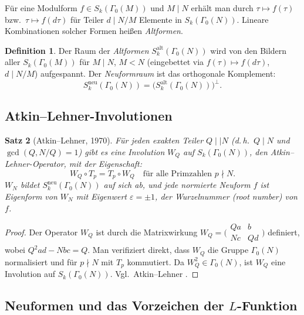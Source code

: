 \documentclass[12pt,a4paper]{amsart}
\newtheorem{theorem}{Satz}[section]
\theoremstyle{definition}
\newtheorem{definition}[theorem]{Definition}
\begin{document}
F\"ur eine Modulform $f \in S_k(\Gamma_0(M))$ und $M \mid N$ erh\"alt man
durch $\tau \mapsto f(\tau)$ bzw.\ $\tau \mapsto f(d\tau)$ f\"ur Teiler
$d \mid N/M$ Elemente in $S_k(\Gamma_0(N))$. Lineare Kombinationen solcher
Formen hei{\ss}en \emph{Altformen}.

\begin{definition}
  Der Raum der \emph{Altformen} $S_k^{\mathrm{alt}}(\Gamma_0(N))$ wird von
  den Bildern aller $S_k(\Gamma_0(M))$ f\"ur $M \mid N$, $M < N$ (eingebettet
  via $f(\tau) \mapsto f(d\tau)$, $d \mid N/M$) aufgespannt. Der
  \emph{Neuformraum} ist das orthogonale Komplement:
  \[
    S_k^{\mathrm{neu}}(\Gamma_0(N)) = \bigl(S_k^{\mathrm{alt}}(\Gamma_0(N))\bigr)^{\perp}.
  \]
\end{definition}

\subsection{Atkin--Lehner-Involutionen}

\begin{theorem}[Atkin--Lehner, 1970]
  F\"ur jeden exakten Teiler $Q \mid\mid N$ (d.\,h.\ $Q \mid N$ und
  $\gcd(Q, N/Q)=1$) gibt es eine Involution $W_Q$ auf $S_k(\Gamma_0(N))$,
  den \emph{Atkin--Lehner-Operator}, mit der Eigenschaft:
  \[
    W_Q \circ T_p = T_p \circ W_Q \quad \text{f\"ur alle Primzahlen } p \nmid N.
  \]
  $W_N$ bildet $S_k^{\mathrm{neu}}(\Gamma_0(N))$ auf sich ab, und jede
  normierte Neuform $f$ ist Eigenform von $W_N$ mit Eigenwert $\varepsilon = \pm 1$,
  der \emph{Wurzelnummer} (\emph{root number}) von $f$.
\end{theorem}

\begin{proof}
  Der Operator $W_Q$ ist durch die Matrixwirkung
  $W_Q = \bigl(\begin{smallmatrix}Qa&b\\Nc&Qd\end{smallmatrix}\bigr)$ definiert,
  wobei $Q^2 ad - Nbc = Q$. Man verifiziert direkt, dass $W_Q$ die Gruppe
  $\Gamma_0(N)$ normalisiert und f\"ur $p \nmid N$ mit $T_p$ kommutiert.
  Da $W_Q^2 \in \Gamma_0(N)$, ist $W_Q$ eine Involution auf $S_k(\Gamma_0(N))$.
  Vgl.\ Atkin--Lehner \cite{AtkinLehner}.
\end{proof}

\subsection{Neuformen und das Vorzeichen der $L$-Funktion}
\end{document}
